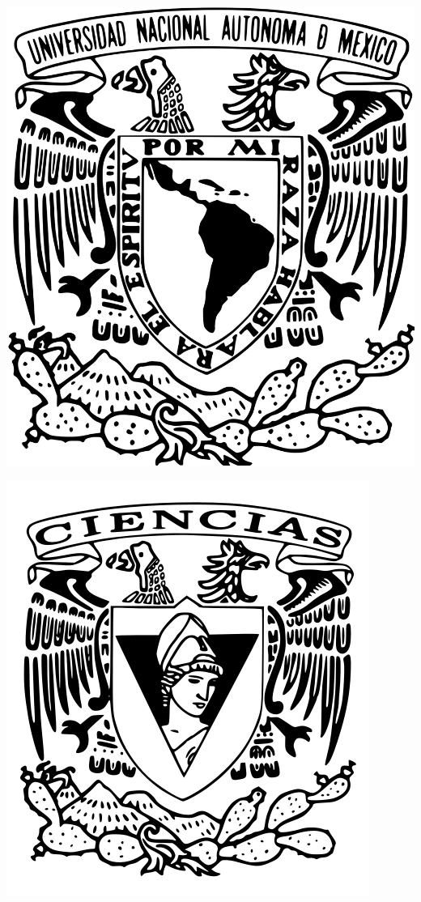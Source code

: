 \begin{center}
    \newcommand{\HRule}{\rule{\linewidth}{0.5mm}}
    \begin{minipage}{0.48\textwidth} 
        \begin{flushleft}
            \includegraphics[scale = 0.08]{images/logo_unam.png}
        \end{flushleft}
    \end{minipage}
    \begin{minipage}{0.48\textwidth} 
        \begin{flushright}
            \includegraphics[scale =0.22]{images/logo_ciencias.png}

\end{flushright}
\end{minipage}
\end{center}
